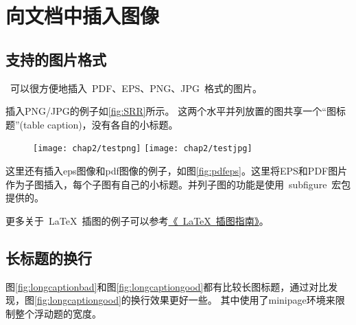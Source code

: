 \section{向文档中插入图像}
\label{sec:insertimage}

\subsection{支持的图片格式}
\label{sec:imageformat}

\XeTeX~可以很方便地插入~PDF、EPS、PNG、JPG~格式的图片。

插入PNG/JPG的例子如\ref{fig:SRR}所示。
这两个水平并列放置的图共享一个``图标题''(table caption)，没有各自的小标题。

\begin{figure}[!htp]
  \centering
  \texttt{[image: chap2/testpng]}
  \hspace{1cm}
  \texttt{[image: chap2/testjpg]}
\end{figure}

这里还有插入eps图像和pdf图像的例子，如图\ref{fig:pdfeps}。这里将EPS和PDF图片作为子图插入，每个子图有自己的小标题。并列子图的功能是使用~subfigure~宏包提供的。

\begin{figure}
  \centering
  \hspace{1in}
\end{figure}

更多关于~\LaTeX~插图的例子可以参考\href{http://www.cs.duke.edu/~junhu/Graphics3.pdf}{《~\LaTeX~插图指南》}。

\subsection{长标题的换行}
\label{sec:longcaption}

图\ref{fig:longcaptionbad}和图\ref{fig:longcaptiongood}都有比较长图标题，通过对比发现，图\ref{fig:longcaptiongood}的换行效果更好一些。
其中使用了minipage环境来限制整个浮动题的宽度。

